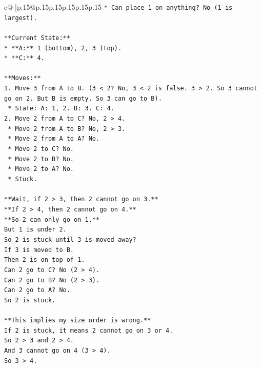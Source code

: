 \documentclass{article}
\begin{document}
{\begin{supertabular}{c@{$\;$}|p{.15\linewidth}@{}p{.15\linewidth}p{.15\linewidth}p{.15\linewidth}p{.15\linewidth}p{.15\linewidth}}
{{{\texttt{*   Can place 1 on anything? No (1 is largest).} \\
\\ 
\texttt{**Current State:**} \\
\texttt{*   **A:** 1 (bottom), 2, 3 (top).} \\
\texttt{*   **C:** 4.} \\
\\ 
\texttt{**Moves:**} \\
\texttt{1.  Move 3 from A to B. (3 < 2? No, 3 < 2 is false. 3 > 2. So 3 cannot go on 2. But B is empty. So 3 can go to B).} \\
\texttt{    *   State: A: 1, 2. B: 3. C: 4.} \\
\texttt{2.  Move 2 from A to C? No, 2 > 4.} \\
\texttt{    *   Move 2 from A to B? No, 2 > 3.} \\
\texttt{    *   Move 2 from A to A? No.} \\
\texttt{    *   Move 2 to C? No.} \\
\texttt{    *   Move 2 to B? No.} \\
\texttt{    *   Move 2 to A? No.} \\
\texttt{    *   Stuck.} \\
\\ 
\texttt{**Wait, if 2 > 3, then 2 cannot go on 3.**} \\
\texttt{**If 2 > 4, then 2 cannot go on 4.**} \\
\texttt{**So 2 can only go on 1.**} \\
\texttt{But 1 is under 2.} \\
\texttt{So 2 is stuck until 3 is moved away?} \\
\texttt{If 3 is moved to B.} \\
\texttt{Then 2 is on top of 1.} \\
\texttt{Can 2 go to C? No (2 > 4).} \\
\texttt{Can 2 go to B? No (2 > 3).} \\
\texttt{Can 2 go to A? No.} \\
\texttt{So 2 is stuck.} \\
\\ 
\texttt{**This implies my size order is wrong.**} \\
\texttt{If 2 is stuck, it means 2 cannot go on 3 or 4.} \\
\texttt{So 2 > 3 and 2 > 4.} \\
\texttt{And 3 cannot go on 4 (3 > 4).} \\
\texttt{So 3 > 4.} \\
}}}
\end{supertabular}}
\end{document}
